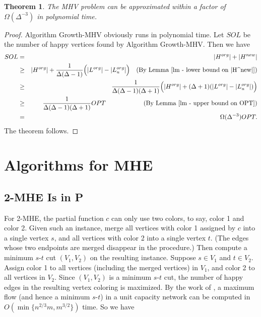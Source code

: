 \documentclass[11pt]{article}
\newtheorem{theorem}{Theorem}[section]
\newcommand{\qed}{\vrule height4pt width4pt depth2pt}
\begin{document}
\begin{theorem}
The MHV problem can be approximated within a factor of $\Omega(\Delta^{-3})$
in polynomial time.
\end{theorem}
\begin{proof}
Algorithm {\sc Growth-MHV} obviously runs in polynomial time.
Let $SOL$ be the number of happy vertices found by Algorithm {\sc Growth-MHV}.
Then we have
\begin{eqnarray}
SOL &=& |H^{org}| + |H^{new}| \nonumber \\
&\geq& |H^{org}| + \frac{1}{\Delta(\Delta-1)}\Bigl(|L^{org}| - |L_{u}^{org}|\Bigr)
\quad \mbox{(By Lemma \ref{lm - lower bound on |H^new|})}
\nonumber \\
&\geq& \frac{1}{\Delta(\Delta-1)(\Delta+1)}\Bigl(|H^{org}| + (\Delta+1)(|L^{org}| - |L_{u}^{org}|)\Bigr)
\nonumber \\
&\geq& \frac{1}{\Delta(\Delta-1)(\Delta+1)} OPT
\qquad \qquad \qquad \mbox{(By Lemma \ref{lm - upper bound on OPT})}
\nonumber \\
&=& \Omega(\Delta^{-3}) OPT. \nonumber
\end{eqnarray}
The theorem follows.
\qed
\end{proof}





\section{Algorithms for MHE}
\label{sec - algorithms for MHE}




\subsection{2-MHE Is in P}
For 2-MHE, the partial function $c$ can only use two colors, to say,
color 1 and color 2. Given such an instance, merge all vertices with color 1
assigned by $c$ into a single vertex $s$, and all vertices with color 2
into a single vertex $t$. (The edges whose two endpoints are merged disappear
in the procedure.) Then compute a minimum $s$-$t$ cut $(V_1, V_2)$ on
the resulting instance. Suppose $s \in V_1$ and $t \in V_2$. Assign color 1
to all vertices (including the merged vertices) in $V_1$, and color 2 to
all vertices in $V_2$. Since $(V_1, V_2)$ is a minimum $s$-$t$ cut,
the number of happy edges in the resulting vertex coloring is maximized.
By the work of \cite{ET75}, a maximum flow (and hence a minimum $s$-$t$)
in a unit capacity network can be computed in $O(\min\{n^{2/3}m, m^{3/2}\})$
time. So we have
\end{document}
